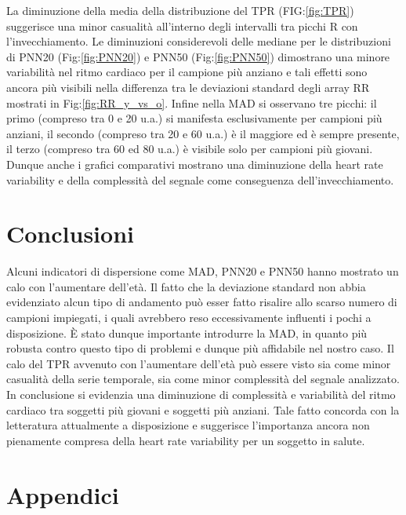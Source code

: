 \documentclass[a4paper, 12pt]{book}
\begin{document}
La diminuzione della media della distribuzione del TPR (FIG:\ref{fig:TPR}) suggerisce una minor casualità all'interno degli intervalli tra picchi R con l'invecchiamento.
Le diminuzioni considerevoli delle mediane per le distribuzioni di PNN20 (Fig:\ref{fig:PNN20}) e PNN50 (Fig:\ref{fig:PNN50}) dimostrano una minore variabilità nel ritmo cardiaco per il campione più anziano e tali effetti sono ancora più visibili nella differenza tra le deviazioni standard degli array RR mostrati in Fig:\ref{fig:RR_y_vs_o}.
Infine nella MAD si osservano tre picchi: il primo (compreso tra 0 e 20 u.a.) si manifesta esclusivamente per campioni più anziani, il secondo (compreso tra 20 e 60 u.a.) è il maggiore ed è sempre presente, il terzo (compreso tra 60 ed 80 u.a.) è visibile solo per campioni più giovani.
Dunque anche i grafici comparativi mostrano una diminuzione della heart rate variability e della complessità del segnale come conseguenza dell'invecchiamento.



\chapter{Conclusioni}



Alcuni indicatori di dispersione come MAD, PNN20 e PNN50 hanno mostrato un calo con l'aumentare dell'età.
Il fatto che la deviazione standard non abbia evidenziato alcun tipo di andamento può esser fatto risalire allo scarso numero di campioni impiegati, i quali avrebbero reso eccessivamente influenti i pochi a disposizione.
È stato dunque importante introdurre la MAD, in quanto più robusta contro questo tipo di problemi e dunque più affidabile nel nostro caso.
Il calo del TPR avvenuto con l'aumentare dell'età può essere visto sia come minor casualità della serie temporale, sia come minor complessità del segnale analizzato.
In conclusione si evidenzia una diminuzione di complessità e variabilità del ritmo cardiaco tra soggetti più giovani e soggetti più anziani.
Tale fatto concorda con la letteratura attualmente a disposizione e suggerisce l'importanza ancora non pienamente compresa della heart rate variability per un soggetto in salute.



\chapter*{Appendici}
\end{document}
